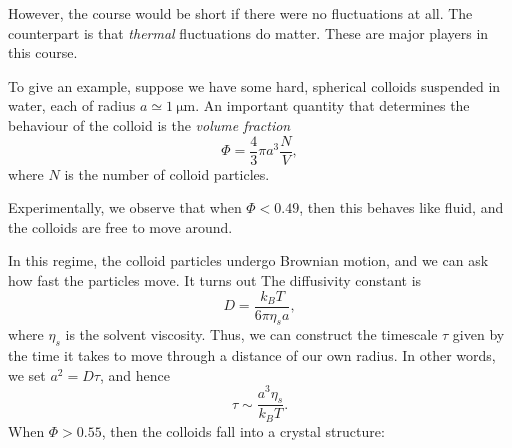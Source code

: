 \documentclass[a4paper]{article}
\begin{document}
However, the course would be short if there were no fluctuations at all. The counterpart is that \emph{thermal} fluctuations do matter. These are major players in this course.

To give an example, suppose we have some hard, spherical colloids suspended in water, each of radius $a \simeq \SI{1}{\micro\meter}$. An important quantity that determines the behaviour of the colloid is the \emph{volume fraction}
\[
  \Phi = \frac{4}{3} \pi a^3 \frac{N}{V},
\]
where $N$ is the number of colloid particles.

Experimentally, we observe that when $\Phi < 0.49$, then this behaves like fluid, and the colloids are free to move around.
\begin{center}
\end{center}
In this regime, the colloid particles undergo Brownian motion, and we can ask how fast the particles move. It turns out The diffusivity constant is
\[
  D = \frac{k_B T}{6 \pi \eta_s a},
\]
where $\eta_s$ is the solvent viscosity. Thus, we can construct the timescale $\tau$ given by the time it takes to move through a distance of our own radius. In other words, we set $a^2 = D \tau$, and hence
\[
  \tau \sim \frac{a^3 \eta_s}{ k_B T}.
\]
When $\Phi > 0.55$, then the colloids fall into a crystal structure:
\end{document}

